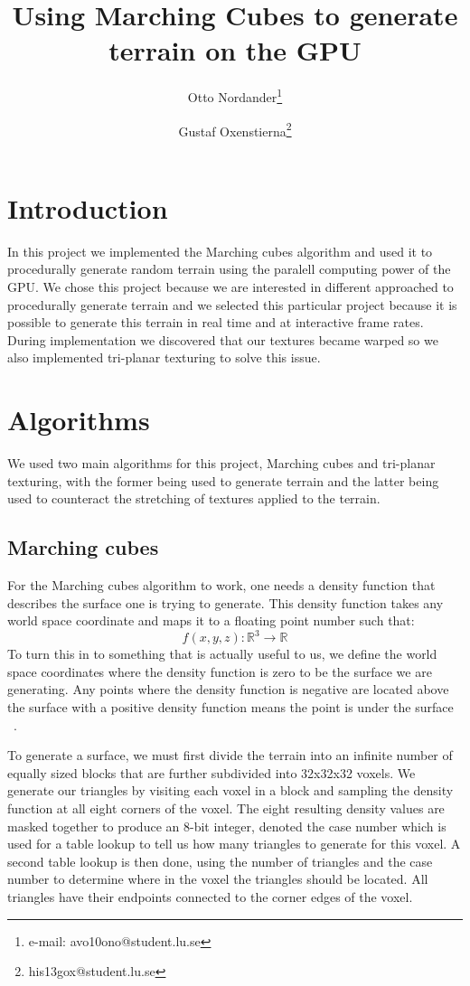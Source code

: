 \documentclass{acmsiggraph}               %
\title{Using Marching Cubes to generate terrain on the GPU}
\author{Otto Nordander\thanks{e-mail: avo10ono@student.lu.se} \and Gustaf Oxenstierna\thanks{his13gox@student.lu.se}
}
\affiliation{Lund University\\ Sweden}
\begin{document}
\ifpdf
\else
\fi


\maketitle

\begin{abstract}
\end{abstract}


\section{Introduction}
In this project we implemented the Marching cubes algorithm and used it to procedurally
generate random terrain using the paralell computing power of the GPU. We chose this project
because we are interested in different approached to procedurally generate terrain and we selected
this particular project because it is possible to generate this terrain in real time and at
interactive frame rates. During implementation we discovered that our textures became warped
so we also implemented tri-planar texturing to solve this issue.
\section{Algorithms}
We used two main algorithms for this project, Marching cubes and tri-planar texturing, with
the former being used to generate terrain and the latter being used to counteract the stretching
of textures applied to the terrain.
\subsection{Marching cubes}
For the Marching cubes algorithm to work, one needs a density function that describes the surface
one is trying to generate. This density function takes any world space coordinate and maps it to
a floating point number such that:
$$ f(x,y,z) : \mathbb{R}^{3} \rightarrow \mathbb{R} $$
To turn this in to something that is actually useful to us, we define the world space coordinates
where the density function is zero to be the surface we are generating. Any points where the density 
function is negative are located above the surface with a positive density function means the point
is under the surface ~\cite{Geiss}.

To generate a surface, we must first divide the terrain into an infinite number of equally sized
blocks that are further subdivided into 32x32x32 voxels. We generate our triangles by visiting
each voxel in a block and sampling the density function at all eight corners of the voxel. The
eight resulting density values are masked together to produce an 8-bit integer, denoted the case number which is used
for a table lookup to tell us how many triangles to generate for this voxel. A second table
lookup is then done, using the number of triangles and the case number to determine where in the
voxel the triangles should be located. All triangles have their endpoints connected to the corner
edges of the voxel.
\end{document}
